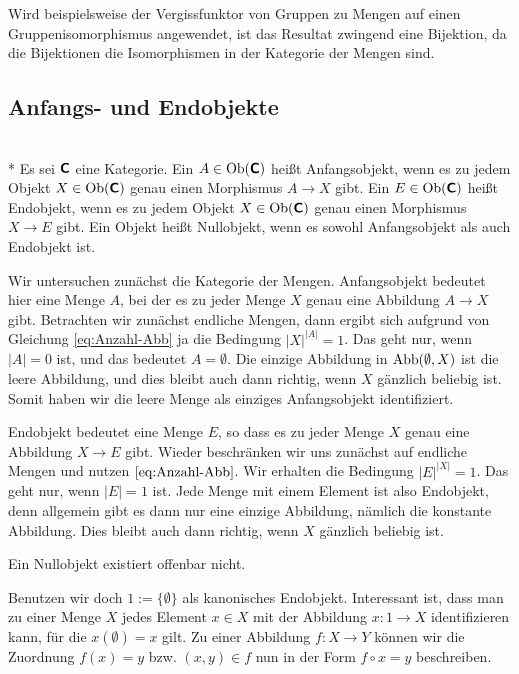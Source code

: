 Wird beispielsweise der Vergissfunktor von Gruppen zu Mengen auf
einen Gruppenisomorphismus angewendet, ist das Resultat zwingend
eine Bijektion, da die Bijektionen die Isomorphismen in der Kategorie
der Mengen sind.

\subsection{Anfangs- und Endobjekte}

\begin{Definition}\mbox{}\\*
Es sei $\textsf{\textbf{C}}$ eine Kategorie. Ein
$A\in\operatorname{Ob}(\textsf{\textbf{C}})$ heißt Anfangsobjekt, wenn
es zu jedem Objekt $X\in\operatorname{Ob}(\textsf{\textbf{C}})$ genau einen
Morphismus $A\to X$ gibt.
Ein $E\in\operatorname{Ob}(\textsf{\textbf{C}})$ heißt Endobjekt, wenn
es zu jedem Objekt $X\in\operatorname{Ob}(\textsf{\textbf{C}})$ genau einen
Morphismus $X\to E$ gibt. Ein Objekt heißt Nullobjekt, wenn
es sowohl Anfangsobjekt als auch Endobjekt ist.
\end{Definition}

\noindent
{}
Wir untersuchen zunächst die Kategorie der Mengen. Anfangsobjekt
bedeutet hier eine Menge $A$, bei der es zu jeder Menge $X$ genau
eine Abbildung $A\to X$ gibt. Betrachten wir zunächst endliche
Mengen, dann ergibt sich aufgrund von Gleichung \eqref{eq:Anzahl-Abb}
ja die Bedingung $|X|^{|A|}=1$. Das geht nur, wenn $|A|=0$ ist,
und das bedeutet $A=\emptyset$. Die einzige Abbildung in $\operatorname{Abb}(\emptyset,X)$
ist die leere Abbildung, und dies bleibt auch dann richtig, wenn
$X$ gänzlich beliebig ist. Somit haben wir die leere Menge als
einziges Anfangsobjekt identifiziert.

Endobjekt bedeutet eine Menge $E$, so dass es zu jeder Menge $X$
genau eine Abbildung $X\to E$ gibt. Wieder beschränken wir uns
zunächst auf endliche Mengen und nutzen $\eqref{eq:Anzahl-Abb}$.
Wir erhalten die Bedingung $|E|^{|X|}=1$. Das geht nur, wenn
$|E|=1$ ist. Jede Menge mit einem Element ist also Endobjekt,
denn allgemein gibt es dann nur eine einzige Abbildung, nämlich
die konstante Abbildung. Dies bleibt auch dann richtig, wenn
$X$ gänzlich beliebig ist.

Ein Nullobjekt existiert offenbar nicht.

Benutzen wir doch $1:=\{\emptyset\}$ als kanonisches Endobjekt.
Interessant ist, dass man zu einer Menge $X$ jedes Element
$x\in X$ mit der Abbildung $x\colon 1\to X$ identifizieren kann,
für die $x(\emptyset)=x$ gilt. Zu einer Abbildung $f\colon X\to Y$
können wir die Zuordnung $f(x)=y$ bzw. $(x,y)\in f$ nun in der Form
$f\circ x = y$ beschreiben.

